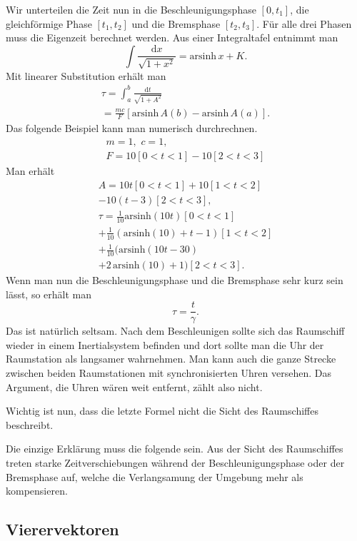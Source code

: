 \documentclass[a4paper,11pt,fleqn,twocolumn,twoside]{scrartcl}
\begin{document}
Wir unterteilen die Zeit nun in die Beschleunigungsphase $[0,t_1]$,
die gleichförmige Phase $[t_1,t_2]$ und die Bremsphase $[t_2,t_3]$.
Für alle drei Phasen muss die Eigenzeit berechnet werden. Aus einer
Integraltafel entnimmt man%
\[\int \frac{\mathrm dx}{\sqrt{1+x^2}} = \mathrm{arsinh}\,x+K.\]
Mit linearer Substitution erhält man%
\begin{gather*}
\tau = \int_a^b \frac{\mathrm dt}{\sqrt{1+A^2}}\\
= \frac{mc}{F}[\mathrm{arsinh}\,A(b)-\mathrm{arsinh}\,A(a)].
\end{gather*}
%
Das folgende Beispiel kann man numerisch durchrechnen.
\begin{gather*}
m=1,\,\,c=1,\\
F = 10[0<t<1]-10[2<t<3]
\end{gather*}
Man erhält
\begin{gather*}
A = 10t[0<t<1]+10[1<t<2]\\
-10(t-3)[2<t<3],\\
\tau = \frac{1}{10}\mathrm{arsinh}(10t)[0<t<1]\\
+ \frac{1}{10}(\mathrm{arsinh}(10)+t-1)[1<t<2]\\
+ \frac{1}{10}(\mathrm{arsinh}(10t-30)\\
+2\,\mathrm{arsinh}(10)+1)[2<t<3].
\end{gather*}
Wenn man nun die Beschleunigungsphase und die Bremsphase sehr kurz
sein lässt, so erhält man%
\[\tau = \frac{t}{\gamma}.\]
Das ist natürlich seltsam. Nach dem Beschleunigen sollte sich das
Raumschiff wieder in einem Inertialsystem befinden und dort sollte
man die Uhr der Raumstation als langsamer wahrnehmen. Man kann auch
die ganze Strecke zwischen beiden Raumstationen mit synchronisierten
Uhren versehen. Das Argument, die Uhren wären weit entfernt,
zählt also nicht.

Wichtig ist nun, dass die letzte Formel nicht die Sicht des
Raumschiffes beschreibt.

Die einzige Erklärung muss die folgende sein. Aus der Sicht des
Raumschiffes treten starke Zeitverschiebungen während der
Beschleunigungsphase oder der Bremsphase auf, welche die Verlangsamung
der Umgebung mehr als kompensieren.


\subsection{Vierervektoren}
\end{document}
